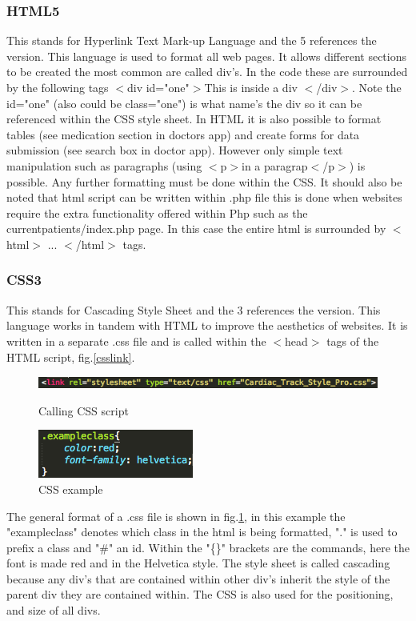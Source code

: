\documentclass[11pt]{article}
\begin{document}
\subsubsection{HTML5}
This stands for Hyperlink Text Mark-up Language and the 5 references the version. This language is used to format all web pages. It allows different sections to be created the most common are called div's. In the code these are surrounded by the following tags $<$div id="one"$>$This is inside a div $<$/div$>$. Note the id="one" (also could be class="one") is what name's the div so it can be referenced within the CSS style sheet. In HTML it is also possible to format tables (see medication section in doctors app) and create forms for data submission (see search box in doctor app). However only simple text manipulation such as paragraphs (using $<$p$>$in a paragrap$<$/p$>$) is possible. Any further formatting must be done within the CSS. It should also be noted that html script can be written within .php file this is done when websites require the extra functionality offered within Php such as the currentpatients/index.php page. In this case the entire html is surrounded by $<$html$>$ ... $<$/html$>$ tags. 
\subsubsection{CSS3}
This stands for Cascading Style Sheet and the 3 references the version. This language works in tandem with HTML to improve the aesthetics of websites. It is written in a separate .css file and is called within the $<$head$>$ tags of the HTML script, fig.\ref{csslink}. 
\begin{figure}[h!] 
\includegraphics[width=\linewidth]{csslink.png}
\caption{Calling CSS script \label{csslink}}
\endminipage\hfill
{}
\includegraphics[width=\linewidth]{exampleclass.png}
\caption{CSS example \label{CSSex}}
\endminipage
\end{figure} 
The general format of a .css file is shown in fig.\ref{CSSex}, in this example the "exampleclass" denotes which class in the html is being formatted, "." is used to prefix a class and "\#" an id. Within the "\{\}" brackets are the commands, here the font is made red and in the Helvetica style. The style sheet is called cascading because any div's that are contained within other div's inherit the style of the parent div they are contained within. The CSS is also used for the positioning, and size of all divs. 
\end{document}
